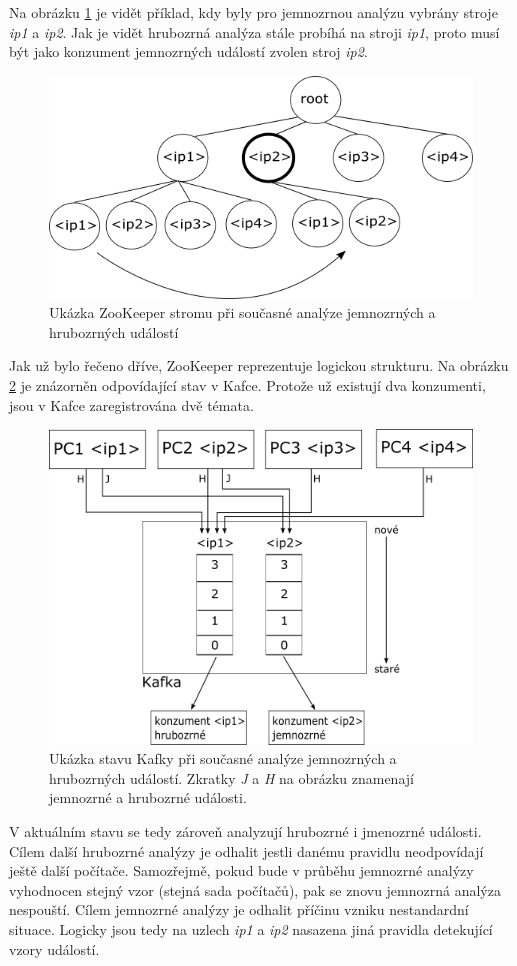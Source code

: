 \documentclass[
  digital, %
  table,   %
  nolof,     %
  nolot,     %
  oneside, %
  nocover,
  monochrome,
  12pt
]{fithesis3}
\begin{document}
Na obrázku \ref{fig:zookeeper-state-1} je vidět příklad, kdy byly pro jemnozrnou analýzu vybrány stroje \textit{ip1} a  \textit{ip2}. Jak je vidět hrubozrná analýza stále probíhá na stroji \textit{ip1}, proto musí být jako konzument jemnozrných událostí zvolen stroj \textit{ip2}.

\begin{figure}[H]
	\centering
    \includegraphics[width=.6\linewidth, height=.2\textheight]{images/zookeeper-state-1.png}
    \caption{Ukázka ZooKeeper stromu při současné analýze jemnozrných a hrubozrných událostí}
    \label{fig:zookeeper-state-1}
\end{figure}

Jak už bylo řečeno dříve, ZooKeeper reprezentuje logickou strukturu. Na obrázku \ref{fig:kafka-state-1} je znázorněn odpovídající stav v Kafce. Protože už existují dva konzumenti, jsou v Kafce zaregistrována dvě témata.

\begin{figure}[H]
	\centering
    \includegraphics[width=.5\linewidth, height=.3\textheight]{images/kafka-state-1.png}
    \caption{Ukázka stavu Kafky při současné analýze jemnozrných a hrubozrných událostí. Zkratky \textit{J} a \textit{H} na obrázku znamenají jemnozrné a hrubozrné události.}
    \label{fig:kafka-state-1}
\end{figure}

V aktuálním stavu se tedy zároveň analyzují hrubozrné i jmenozrné události. Cílem další hrubozrné analýzy je odhalit jestli danému pravidlu neodpovídají ještě další počítače. Samozřejmě, pokud bude v průběhu jemnozrné analýzy vyhodnocen stejný vzor (stejná sada počítačů), pak se znovu jemnozrná analýza nespouští. Cílem jemnozrné analýzy je odhalit příčinu vzniku nestandardní situace. Logicky jsou tedy na uzlech \textit{ip1} a  \textit{ip2} nasazena jiná pravidla detekující vzory událostí.
\end{document}

